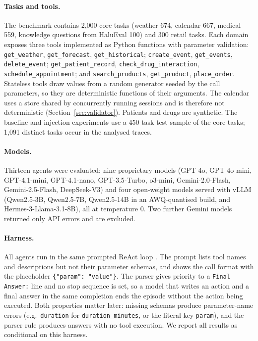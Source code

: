 \documentclass[pdflatex,sn-mathphys-num,Numbered]{sn-jnl}
\begin{document}
\paragraph{Tasks and tools.} The benchmark contains 2,000 core tasks (weather 674, calendar 667, medical 559, knowledge questions from HaluEval 100) and 300 retail tasks. Each domain exposes three tools implemented as Python functions with parameter validation: \texttt{get\_weather}, \texttt{get\_forecast}, \texttt{get\_historical}; \texttt{create\_event}, \texttt{get\_events}, \texttt{delete\_event}; \texttt{get\_patient\_record}, \texttt{check\_drug\_interaction}, \texttt{schedule\_appointment}; and \texttt{search\_products}, \texttt{get\_product}, \texttt{place\_order}. Stateless tools draw values from a random generator seeded by the call parameters, so they are deterministic functions of their arguments. The calendar uses a store shared by concurrently running sessions and is therefore not deterministic (Section~\ref{sec:validator}). Patients and drugs are synthetic. The baseline and injection experiments use a 450-task test sample of the core tasks; 1,091 distinct tasks occur in the analysed traces.

\paragraph{Models.} Thirteen agents were evaluated: nine proprietary models (GPT-4o, GPT-4o-mini, GPT-4.1-mini, GPT-4.1-nano, GPT-3.5-Turbo, o3-mini, Gemini-2.0-Flash, Gemini-2.5-Flash, DeepSeek-V3) and four open-weight models served with vLLM (Qwen2.5-3B, Qwen2.5-7B, Qwen2.5-14B in an AWQ-quantised build, and Hermes-3-Llama-3.1-8B), all at temperature 0. Two further Gemini models returned only API errors and are excluded.

\paragraph{Harness.} All agents run in the same prompted ReAct loop \cite{yao2023react}. The prompt lists tool names and descriptions but not their parameter schemas, and shows the call format with the placeholder \texttt{\{"param": "value"\}}. The parser gives priority to a \texttt{Final Answer:} line and no stop sequence is set, so a model that writes an action and a final answer in the same completion ends the episode without the action being executed. Both properties matter later: missing schemas produce parameter-name errors (e.g.\ \texttt{duration} for \texttt{duration\_minutes}, or the literal key \texttt{param}), and the parser rule produces answers with no tool execution. We report all results as conditional on this harness.
\end{document}
